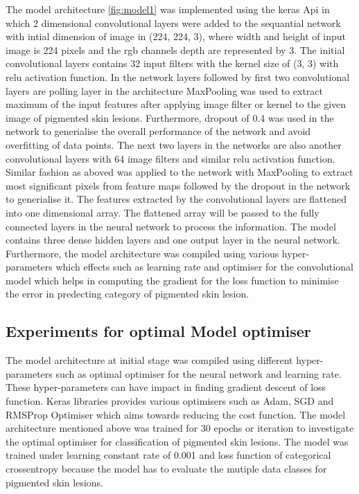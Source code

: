 The model architecture \ref{fig:model1} was implemented using the keras Api in which 2 dimensional 
convolutional layers were added to the sequantial network with intial dimension of image in (224, 224, 3), where width and height of input image is 224 pixels and the rgb channels depth 
are represented by 3. The initial convolutional layers contains 32 input filters with the kernel size of (3, 3) with relu 
activation function. In the network layers followed by first two convolutional layers are polling layer in the 
architecture MaxPooling was used to extract maximum of the input features after applying image filter or kernel 
to the given image of pigmented skin lesions. Furthermore, dropout of 0.4 was used in the network to generialise the 
overall performance of the network and avoid overfitting of data points. 
The next two layers in the networks are also another convolutional layers with 64 image filters and similar relu activation function. Similar fashion as aboved was 
applied to the network with MaxPooling to extract most significant pixels from feature maps followed by the dropout in the network to generialise it.
The features extracted by the convolutional layers are flattened into one dimensional array. The flattened array will be passed to the fully connected layers in the neural network
to process the information. The model contains three dense hidden layers and one output layer in the neural network.
Furthermore, the model architecture was compiled using various hyper-parameters which effects such as learning rate and 
optimiser for the convolutional model which helps in computing the gradient for the loss function to minimise the error in predecting 
category of pigmented skin lesion.

\subsection{Experiments for optimal Model optimiser}
The model architecture at initial stage was compiled using different hyper-parameters
such as optimal optimiser for the neural network and learning rate. These 
hyper-parameters can have impact in finding gradient descent of loss function. Keras libraries 
provides various optimisers such as Adam, SGD and RMSProp Optimiser which 
aims towards reducing the cost function. The model architecture mentioned above was trained for 30 epochs or iteration to 
investigate the optimal optimiser for classification of pigmented skin lesions. The model was trained under learning 
constant rate of 0.001 and loss function of categorical crossentropy because the model has to evaluate the mutiple data classes 
for pigmented skin lesions.

